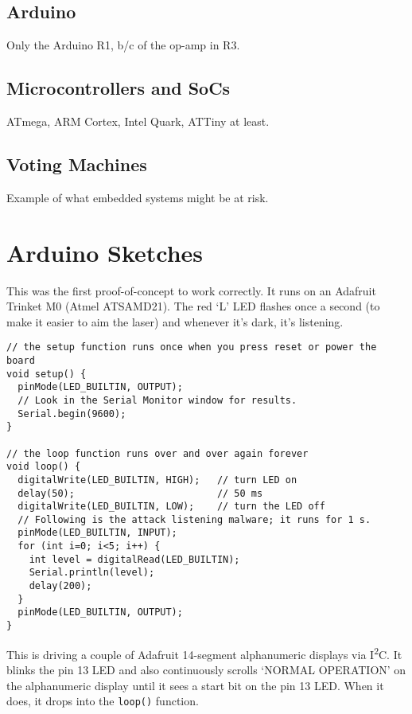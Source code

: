 \documentclass[a4paper,notitlepage]{article}
\begin{document}
\subsection{Arduino}
Only the Arduino R1, b/c of the op-amp in R3.
\subsection{Microcontrollers and SoCs}
ATmega, ARM Cortex, Intel Quark, ATTiny at least.
\subsection{Voting Machines}
Example of what embedded systems might be at risk.


\appendix
\section{Arduino Sketches}
This was the first proof-of-concept to work correctly. It runs on an Adafruit
Trinket M0 (Atmel ATSAMD21). The red `L' LED flashes once a second (to make it
easier to aim the laser) and whenever it's dark, it's listening.
\begin{verbatim}
// the setup function runs once when you press reset or power the board
void setup() {
  pinMode(LED_BUILTIN, OUTPUT);
  // Look in the Serial Monitor window for results.
  Serial.begin(9600);
}

// the loop function runs over and over again forever
void loop() {
  digitalWrite(LED_BUILTIN, HIGH);   // turn LED on
  delay(50);                         // 50 ms
  digitalWrite(LED_BUILTIN, LOW);    // turn the LED off
  // Following is the attack listening malware; it runs for 1 s.
  pinMode(LED_BUILTIN, INPUT);
  for (int i=0; i<5; i++) {
    int level = digitalRead(LED_BUILTIN);
    Serial.println(level);
    delay(200);
  }
  pinMode(LED_BUILTIN, OUTPUT);
}
\end{verbatim}
This is driving a couple of Adafruit 14-segment alphanumeric displays via
I\textsuperscript{2}C. It blinks the pin 13 LED and also continuously scrolls
`NORMAL OPERATION' on the alphanumeric display until it sees a start bit on the
pin 13 LED. When it does, it drops into the \texttt{loop()} function.
\end{document}

